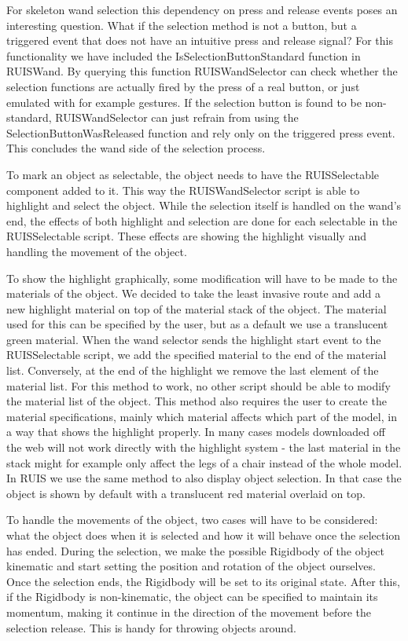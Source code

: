 \documentclass[12pt,a4paper,oneside,pdftex]{report}
\begin{document}
For skeleton wand selection this dependency on press and release events poses an interesting question. What if the selection method is not a button, but a triggered event that does not have an intuitive press and release signal? For this functionality we have included the IsSelectionButtonStandard function in RUISWand. By querying this function RUISWandSelector can check whether the selection functions are actually fired by the press of a real button, or just emulated with for example gestures. If the selection button is found to be non-standard, RUISWandSelector can just refrain from using the SelectionButtonWasReleased function and rely only on the triggered press event. This concludes the wand side of the selection process.

To mark an object as selectable, the object needs to have the RUISSelectable component added to it. This way the RUISWandSelector script is able to highlight and select the object. While the selection itself is handled on the wand's end, the effects of both highlight and selection are done for each selectable in the RUISSelectable script. These effects are showing the highlight visually and handling the movement of the object. 

To show the highlight graphically, some modification will have to be made to the materials of the object. We decided to take the least invasive route and add a new highlight material on top of the material stack of the object. The material used for this can be specified by the user, but as a default we use a translucent green material. When the wand selector sends the highlight start event to the RUISSelectable script, we add the specified material to the end of the material list. Conversely, at the end of the highlight we remove the last element of the material list. For this method to work, no other script should be able to modify the material list of the object. This method also requires the user to create the material specifications, mainly which material affects which part of the model, in a way that shows the highlight properly. In many cases models downloaded off the web will not work directly with the highlight system - the last material in the stack might for example only affect the legs of a chair instead of the whole model. In RUIS we use the same method to also display object selection. In that case the object is shown by default with a translucent red material overlaid on top.

To handle the movements of the object, two cases will have to be considered: what the object does when it is selected and how it will behave once the selection has ended. During the selection, we make the possible Rigidbody of the object kinematic and start setting the position and rotation of the object ourselves. Once the selection ends, the Rigidbody will be set to its original state. After this, if the Rigidbody is non-kinematic, the object can be specified to maintain its momentum, making it continue in the direction of the movement before the selection release. This is handy for throwing objects around.
\end{document}
